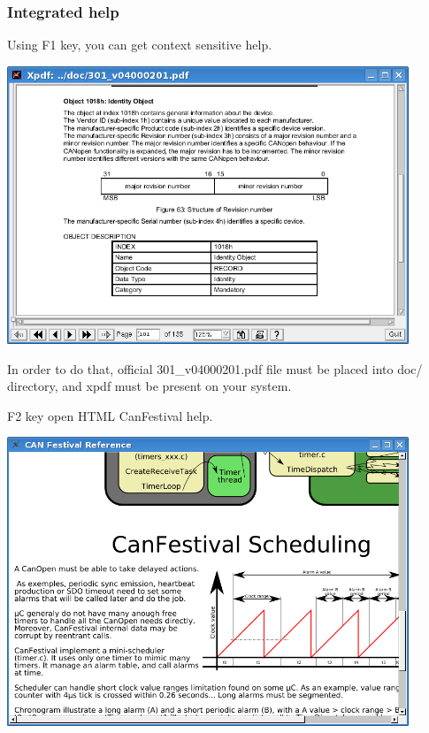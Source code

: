 \documentclass[a4paper,12pt]{book}
\begin{document}
\subsubsection{Integrated help}
Using F1 key, you can get context sensitive help.\newline
 \begin{center}
   \includegraphics[width=12cm]{Pictures/10000201000002F30000020B23ED7F67.png}
\end{center}

In order to do that, official 301\_v04000201.pdf file must be placed
into doc/ directory, and xpdf must be present on your system.

F2 key open HTML CanFestival help.\newline
 \begin{center}
   \includegraphics[width=12cm]{Pictures/10000201000003440000025ACC3FD2F1.png}
\end{center}
\end{document}

